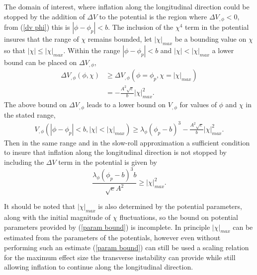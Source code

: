 \documentclass[letterpaper,11pt]{article}
\begin{document}
The domain of interest, where inflation along the longitudinal direction could be stopped by the addition of $\Delta V$ to the potential is the region where $\Delta V_{,\phi} < 0$, from (\ref{dv phi}) this is $|\phi - \phi_p|<b$. The inclusion of the $\chi^4$ term in the potential insures that the range of $\chi$ remains bounded, let $|\chi|_{max}$ be a bounding value on $\chi$ so that $|\chi| \leq |\chi|_{max}$. Within the range $|\phi-\phi_p|<b$ and $|\chi|<|\chi|_{max}$ a lower bound can be placed on $\Delta V_{,\phi}$,
\begin{align}
\Delta V_{,\phi}(\phi, \chi) &\geq \Delta V_{,\phi}(\phi=\phi_p, \chi=|\chi|_{max}) \\
&= -\frac{A^2\sqrt{e}}{b}|\chi|_{max}^2.
\end{align}
The above bound on $\Delta V_{,\phi}$ leads to a lower bound on $V_{,\phi}$ for values of $\phi$ and $\chi$ in the stated range,
\begin{align}
V_{,\phi}(|\phi-\phi_p|<b, |\chi|<|\chi|_{max}) \geq \lambda_{\phi}(\phi_p-b)^3 - \frac{A^2\sqrt{e}}{b}|\chi|_{max}^2.
\end{align}
Then in the same range and in the slow-roll approximation a sufficient condition to insure that inflation along the longitudinal direction is not stopped by including the $\Delta V$ term in the potential is given by
\begin{equation}
\frac{\lambda_{\phi}(\phi_p-b)^3b}{\sqrt{e}A^2} \geq |\chi|_{max}^2. \label{param bound}
\end{equation}

It should be noted that $|\chi|_{max}$ is also determined by the potential parameters, along with the initial magnitude of $\chi$ fluctuations, so the bound on potential parameters provided by (\ref{param bound}) is incomplete. In principle $|\chi|_{max}$ can be estimated from the parameters of the potentials, however even without performing such an estimate (\ref{param bound}) can still be used a scaling relation for the maximum effect size the transverse instability can provide while still allowing inflation to continue along the longitudinal direction.

\end{document}
